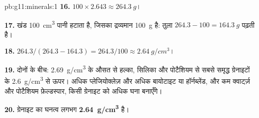 \begin{solution}{pb:g11:minerals:1}
\textbf{16.} $100 \times 2.643 \approx \qty{264.3}{g}$।

\textbf{17.} खंड \qty{100}{cm^3} पानी हटाता है, जिसका द्रव्यमान
\qty{100}{g} है: तुला $264.3 - 100 = \qty{164.3}{g}$ पढ़ती है।

\textbf{18.} $264.3/(264.3 - 164.3) = 264.3/100 \approx \qty{2.64}{g/cm^3}$।

\textbf{19.} दोनों के बीच: \qty{2.69}{g/cm^3} के औसत से हल्का,
सिलिका और पोटैशियम से सबसे समृद्ध ग्रेनाइटों के \qty{2.6}{g/cm^3} से ऊपर।
अधिक प्लेजियोक्लेज़ और अधिक बायोटाइट या हॉर्नब्लेंड, और कम क्वार्ट्ज़ और
पोटैशियम फ़ेल्डस्पार, किसी ग्रेनाइट को अधिक घना बनाएँगे।

\textbf{20.} ग्रेनाइट का घनत्व लगभग
\textbf{\qty{2.64}{g/cm^3}} है।
\end{solution}
